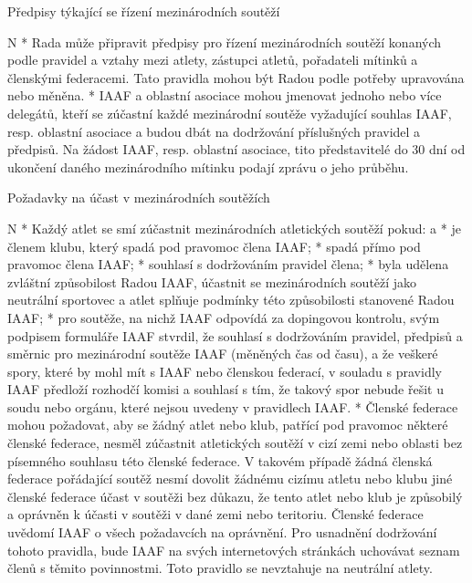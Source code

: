 \secc Předpisy týkající se řízení mezinárodních soutěží

\begitems \style N
* Rada může připravit předpisy pro řízení mezinárodních soutěží konaných podle pravidel a vztahy mezi atlety, zástupci atletů, pořadateli mítinků a členskými federacemi. Tato pravidla mohou být Radou podle potřeby upravována nebo měněna.
* IAAF a oblastní asociace mohou jmenovat jednoho nebo více delegátů, kteří se zúčastní každé mezinárodní soutěže vyžadující souhlas IAAF, resp. oblastní asociace a budou dbát na dodržování příslušných pravidel a předpisů. Na žádost IAAF, resp. oblastní asociace, tito představitelé do 30 dní od ukončení daného mezinárodního mítinku podají zprávu o jeho průběhu.
\enditems

\secc Požadavky na účast v mezinárodních soutěžích

\begitems \style N
* Každý atlet se smí zúčastnit mezinárodních atletických soutěží pokud:
  \begitems \style a
  * je členem klubu, který spadá pod pravomoc člena IAAF;
  * spadá přímo pod pravomoc člena IAAF;
  * souhlasí s dodržováním pravidel člena;
  * byla udělena zvláštní způsobilost Radou IAAF, účastnit  se mezinárodních soutěží jako neutrální sportovec a atlet splňuje podmínky této způsobilosti stanovené Radou IAAF;
  * pro soutěže, na nichž IAAF odpovídá za dopingovou kontrolu, svým podpisem formuláře IAAF stvrdil, že souhlasí s dodržováním pravidel, předpisů a směrnic pro mezinárodní soutěže IAAF (měněných čas od času), a že veškeré spory, které by mohl mít s IAAF nebo členskou federací, v souladu s pravidly IAAF předloží rozhodčí komisi a souhlasí s tím, že takový spor nebude řešit u soudu nebo orgánu, které nejsou uvedeny v pravidlech IAAF.
  \enditems
* Členské federace mohou požadovat, aby se žádný atlet nebo klub, patřící pod pravomoc některé členské federace, nesměl zúčastnit atletických soutěží v cizí zemi nebo oblasti bez písemného souhlasu této členské federace. V takovém případě žádná členská federace pořádající soutěž nesmí dovolit žádnému cizímu atletu nebo klubu jiné členské federace účast v soutěži bez důkazu, že tento atlet nebo klub je způsobilý a oprávněn k účasti v soutěži v dané zemi nebo teritoriu. Členské federace uvědomí IAAF o všech požadavcích na oprávnění. Pro usnadnění dodržování tohoto pravidla, bude IAAF na svých internetových stránkách uchovávat seznam členů s těmito povinnostmi. Toto pravidlo se nevztahuje na neutrální atlety.
